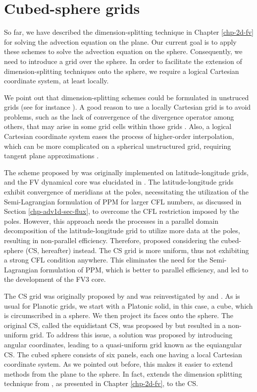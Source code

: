 \chapter{Cubed-sphere grids}
\label{chp-cs-grids}
So far, we have described the dimension-splitting technique in Chapter \ref{chp-2d-fv} for solving the advection equation on the plane.
Our current goal is to apply these schemes to solve the advection equation on the sphere.
Consequently, we need to introduce a grid over the sphere.
In order to facilitate the extension of dimension-splitting techniques onto the sphere, we require a logical Cartesian coordinate system, at least locally.

We point out that dimension-splitting schemes could be formulated in unstruced grids (see for instance \citet{herzfeld:2023}).
A good reason to use a locally Cartesian grid is to avoid problems, such as the lack of convergence of the divergence operator among others,
that may arise in some grid cells within those grids \citep{peixoto:2013, peixoto:2016, weller:2012}.
Also, a logical Cartesian coordinate system eases the process of higher-order interpolation,
which can be more complicated on a spherical unstructured grid, requiring tangent plane approximations \citep{peixoto:2014,skamarock:2011}.

The scheme proposed by \citet{lin:1996} was originally implemented on latitude-longitude grids,
and the FV dynamical core was elucidated in \citet{lin:2004}.
The latitude-longitude grids exhibit convergence of meridians at the poles, 
necessitating the utilization of the Semi-Lagrangian formulation of PPM for larger CFL numbers,
as discussed in Section \ref{chp-adv1d-sec-flux}, 
to overcome the CFL restriction imposed by the poles.
However, this approach needs the processes in a parallel domain decomposition of the latitude-longitude grid to utilize more
data at the poles, resulting in non-parallel efficiency.
Therefore, \citet{putman:2007} proposed considering the cubed-sphere (CS, hereafter) instead.
The CS grid is more uniform, thus not exhibiting a strong CFL condition anywhere.
This eliminates the need for the Semi-Lagrangian formulation of PPM, which is better to parallel efficiency, and led to the development of the FV3 core.


The CS grid was originally proposed by \citet{sadourny:1972} and was 
reinvestigated by \citet{ronchi:1996} and \citet{rancic:1996}. 
As is usual for Planotic grids, we start with a Platonic solid, in this case, a cube, 
which is circumscribed in a sphere. We then project its faces onto the sphere.
The original CS, called the equidistant CS, was proposed by 
\citet{sadourny:1972} but resulted in a non-uniform grid. 
To address this issue, a solution was proposed by introducing angular coordinates, 
leading to a quasi-uniform grid known as the equiangular CS.
The cubed sphere consists of six panels, each one having a local Cartesian coordinate 
system. 
As we pointed out before, this makes it easier to extend methods from the plane to the sphere. 
In fact, \citet{putman:2007} extends the dimension splitting technique from 
\citet{lin:1996}, as presented in Chapter \ref{chp-2d-fv}, to the CS.

